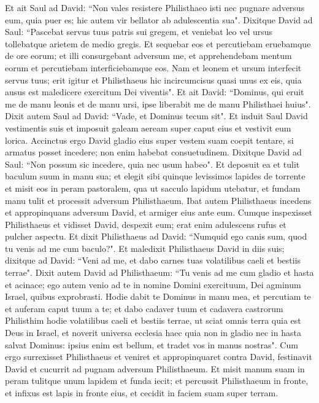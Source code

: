 \begin{biblechapter}
\verse Et ait Saul ad David: “Non vales resistere Philisthaeo isti nec pugnare adversus eum, quia puer es; hic autem vir bellator ab adulescentia sua". 
\verse Dixitque David ad Saul: “Pascebat servus tuus patris sui gregem, et veniebat leo vel ursus tollebatque arietem de medio gregis. 
\verse Et sequebar eos et percutiebam eruebamque de ore eorum; et illi consurgebant adversum me, et apprehendebam mentum eorum et percutiebam interficiebamque eos. 
\verse Nam et leonem et ursum interfecit servus tuus; erit igitur et Philisthaeus hic incircumcisus quasi unus ex eis, quia ausus est maledicere exercitum Dei viventis". 
\verse Et ait David: “Dominus, qui eruit me de manu leonis et de manu ursi, ipse liberabit me de manu Philisthaei huius". Dixit autem Saul ad David: “Vade, et Dominus tecum sit". 
\verse Et induit Saul David vestimentis suis et imposuit galeam aeream super caput eius et vestivit eum lorica. 
\verse Accinctus ergo David gladio eius super vestem suam coepit tentare, si armatus posset incedere; non enim habebat consuetudinem. Dixitque David ad Saul: “Non possum sic incedere, quia nec usum habeo". Et deposuit ea 
\verse et tulit baculum suum in manu sua; et elegit sibi quinque levissimos lapides de torrente et misit eos in peram pastoralem, qua ut sacculo lapidum utebatur, et fundam manu tulit et processit adversum Philisthaeum. 
\verse Ibat autem Philisthaeus incedens et appropinquans adversum David, et armiger eius ante eum. 
\verse Cumque inspexisset Philisthaeus et vidisset David, despexit eum; erat enim adulescens rufus et pulcher aspectu. 
\verse Et dixit Philisthaeus ad David: “Numquid ego canis sum, quod tu venis ad me cum baculo?". Et maledixit Philisthaeus David in diis suis; 
\verse dixitque ad David: “Veni ad me, et dabo carnes tuas volatilibus caeli et bestiis terrae". 
\verse Dixit autem David ad Philisthaeum: “Tu venis ad me cum gladio et hasta et acinace; ego autem venio ad te in nomine Domini exercituum, Dei agminum Israel, quibus exprobrasti. 
\verse Hodie dabit te Dominus in manu mea, et percutiam te et auferam caput tuum a te; et dabo cadaver tuum et cadavera castrorum Philisthim hodie volatilibus caeli et bestiis terrae, ut sciat omnis terra quia est Deus in Israel, 
\verse et noverit universa ecclesia haec quia non in gladio nec in hasta salvat Dominus: ipsius enim est bellum, et tradet vos in manus nostras". 
\verse Cum ergo surrexisset Philisthaeus et veniret et appropinquaret contra David, festinavit David et cucurrit ad pugnam adversum Philisthaeum. 
\verse Et misit manum suam in peram tulitque unum lapidem et funda iecit; et percussit Philisthaeum in fronte, et infixus est lapis in fronte eius, et cecidit in faciem suam super terram. 

\end{biblechapter}
